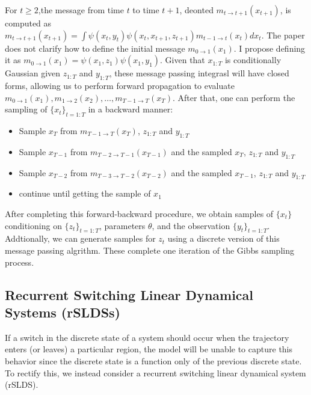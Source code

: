 For $t\geq 2$,the message from time $t$ to time $t+1$, deonted $m_{t \rightarrow t+1}(x_{t+1})$, is computed as 
$ m_{t \rightarrow t+1}(x_{t+1})=\int \psi(x_t,y_t) \psi(x_t,x_{t+1},z_{t+1}) m_{t-1 \rightarrow t}(x_t) dx_t $. The paper does not clarify how to define the initial message $m_{0 \rightarrow 1}(x_1)$. I propose defining it as $m_{0 \rightarrow 1}(x_1)=\psi\left(x_{1}, z_{1}\right) \psi\left(x_{1}, y_{1}\right)$. Given that $x_{1:T}$ is  conditionally Gaussian given $z_{1:T}$ and $y_{1:T}$, these message passing integrasl will have closed forms, allowing us to perform forward propagation to evaluate $m_{0 \rightarrow 1}(x_1), m_{1 \rightarrow 2}(x_2),\dots, m_{T-1 \rightarrow T}(x_T)$. After that, one can perform the sampling of $\{x_t\}_{t=1:T}$ in a backward manner: 
\begin{itemize}
  \item Sample $x_T$ from $m_{T-1 \rightarrow T}(x_T)$, $z_{1:T}$ and $y_{1:T}$
  \item Sample $x_{T-1}$ from $m_{T-2 \rightarrow T-1}(x_{T-1})$ and the sampled $x_T$, $z_{1:T}$ and $y_{1:T}$
  \item Sample $x_{T-2}$ from $m_{T-3 \rightarrow T-2}(x_{T-2})$ and the sampled $x_{T-1}$, $z_{1:T}$ and $y_{1:T}$
  \item continue until getting the sample of $x_1$
\end{itemize}
After completing this forward-backward procedure, we obtain samples of $\{x_t\}$ conditioning on $\{z_t\}_{t=1:T}$, parameters $\theta$, and the observation $\{y_t\}_{t=1:T}$. Addtionally, we can generate samples for $z_t$ using a discrete version of this message passing algrithm. These complete one iteration of the Gibbs sampling process.



\subsection{Recurrent Switching Linear Dynamical Systems (rSLDSs)}

If a switch in the discrete state of a system should occur when the trajectory enters (or leaves) a particular region, the model will be unable to capture this behavior since the discrete state is a function only of the previous discrete state. To rectify this, we instead consider a recurrent switching linear dynamical system (rSLDS). 

